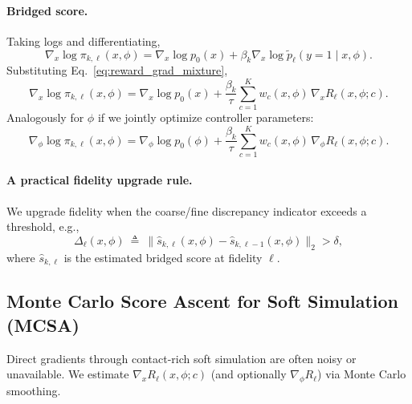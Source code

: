 \paragraph{Bridged score.}
Taking logs and differentiating,
\begin{equation}
\nabla_x \log \pi_{k,\ell}(x,\phi)
=
\nabla_x \log p_0(x)
+
\beta_k \nabla_x \log \tilde p_{\ell}(y=1\mid x,\phi).
\label{eq:bridge_score_general}
\end{equation}
Substituting Eq.~\eqref{eq:reward_grad_mixture},
\begin{equation}
\nabla_x \log \pi_{k,\ell}(x,\phi)
=
\nabla_x \log p_0(x)
+
\frac{\beta_k}{\tau}
\sum_{c=1}^{K} w_c(x,\phi)\,\nabla_x R_{\ell}(x,\phi;c).
\label{eq:bridge_score_reward}
\end{equation}
Analogously for $\phi$ if we jointly optimize controller parameters:
\begin{equation}
\nabla_\phi \log \pi_{k,\ell}(x,\phi)
=
\nabla_\phi \log p_0(\phi)
+
\frac{\beta_k}{\tau}
\sum_{c=1}^{K} w_c(x,\phi)\,\nabla_\phi R_{\ell}(x,\phi;c).
\label{eq:bridge_score_phi}
\end{equation}

\paragraph{A practical fidelity upgrade rule.}
We upgrade fidelity when the coarse/fine discrepancy indicator exceeds a threshold,
e.g.,
\begin{equation}
\Delta_{\ell}(x,\phi)
~\triangleq~
\big\|\widehat{s}_{k,\ell}(x,\phi)-\widehat{s}_{k,\ell-1}(x,\phi)\big\|_2
>\delta,
\label{eq:fidelity_rule}
\end{equation}
where $\widehat{s}_{k,\ell}$ is the estimated bridged score at fidelity $\ell$.

\subsection{Monte Carlo Score Ascent for Soft Simulation (MCSA)}
\label{subsec:mcsa}

Direct gradients through contact-rich soft simulation are often noisy or unavailable.
We estimate $\nabla_x R_\ell(x,\phi;c)$ (and optionally $\nabla_\phi R_\ell$) via Monte Carlo smoothing.


